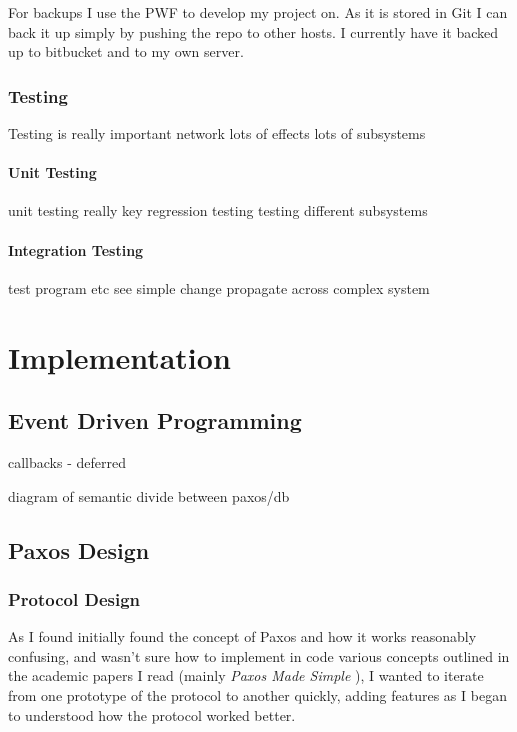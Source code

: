 \documentclass[12pt,twoside,notitlepage]{report}
\begin{document}
For backups I use the PWF to develop my project on. As it is stored in Git I can back it up simply
by pushing the repo to other hosts. I currently have it backed up to bitbucket and to my own
server.

\subsection{Testing}

Testing is really important
network
lots of effects
lots of subsystems

\subsubsection{Unit Testing}

unit testing really key
regression testing
testing different subsystems

\subsubsection{Integration Testing}

test program etc
see simple change propagate across complex system



\cleardoublepage
\chapter{Implementation}

\section{Event Driven Programming}

callbacks - deferred

diagram of semantic divide between paxos/db

\section{Paxos Design}

\subsection{Protocol Design}

As I found initially found the concept of Paxos and how it works reasonably confusing, and wasn't
sure how to implement in code various concepts outlined in the academic papers I read (mainly
\emph{Paxos Made Simple} \cite{lamport01}), I wanted to iterate from one prototype of the protocol
to another quickly, adding features as I began to understood how the protocol worked better.
\end{document}
